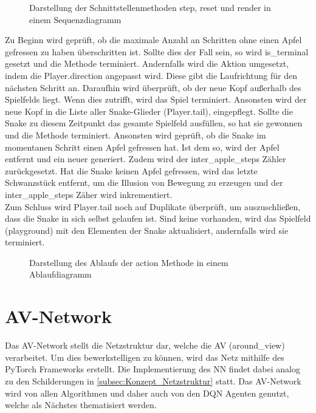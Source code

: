 \begin{figure}[H]
	\centering
	
	\caption[Darstellung der Schnittstellenmethoden in einem Sequenzdiagramm]{Darstellung der Schnittstellenmethoden step, reset und render in einem Sequenzdiagramm}
	\label{fig:Implementierung_Sequenzdiagram}
\end{figure}
Zu Beginn wird geprüft, ob die maximale Anzahl an Schritten ohne einen Apfel gefressen zu haben überschritten ist. Sollte dies der Fall sein, so wird is\_terminal gesetzt und die Methode terminiert. Andernfalls wird die Aktion umgesetzt, indem die Player.direction angepasst wird. Diese gibt die Laufrichtung für den nächsten Schritt an. Daraufhin wird überprüft, ob der neue Kopf außerhalb des Spielfelds liegt. Wenn dies zutrifft, wird das Spiel terminiert.
Ansonsten wird der neue Kopf in die Liste aller Snake-Glieder (Player.tail), eingepflegt. Sollte die Snake zu diesem Zeitpunkt das gesamte Spielfeld ausfüllen, so hat sie gewonnen und die Methode terminiert. Ansonsten wird geprüft, ob die Snake im momentanen Schritt einen Apfel gefressen hat. Ist dem so, wird der Apfel entfernt und ein neuer generiert. Zudem wird der inter\_apple\_steps Zähler zurückgesetzt. Hat die Snake keinen Apfel gefressen, wird das letzte Schwanzstück entfernt, um die Illusion von Bewegung zu erzeugen und der inter\_apple\_steps Zäher wird inkrementiert.\\
Zum Schluss wird Player.tail noch auf Duplikate überprüft, um auszuschließen, dass die Snake in sich selbst gelaufen ist. Sind keine vorhanden, wird das Spielfeld (playground) mit den Elementen der Snake aktualisiert, andernfalls wird sie terminiert.
\begin{figure}[H]
	\centering
	
	\caption[Ablaufdiagramm der action Methode]{Darstellung des Ablaufs der action Methode in einem Ablaufdiagramm}
	\label{fig:Implementierung_action_method}
\end{figure}

\section{AV-Network} \label{sec:Implementierung_AV_Network}
Das AV-Network stellt die Netzstruktur dar, welche die AV (around\_view) verarbeitet. Um dies bewerkstelligen zu können, wird das Netz mithilfe des PyTorch Frameworks erstellt. Die Implementierung des NN findet dabei analog zu den Schilderungen in \autoref{subsec:Konzept_Netzstruktur} statt. Das AV-Network wird von allen Algorithmen und daher auch von den DQN Agenten genutzt, welche als Nächstes thematisiert werden.

